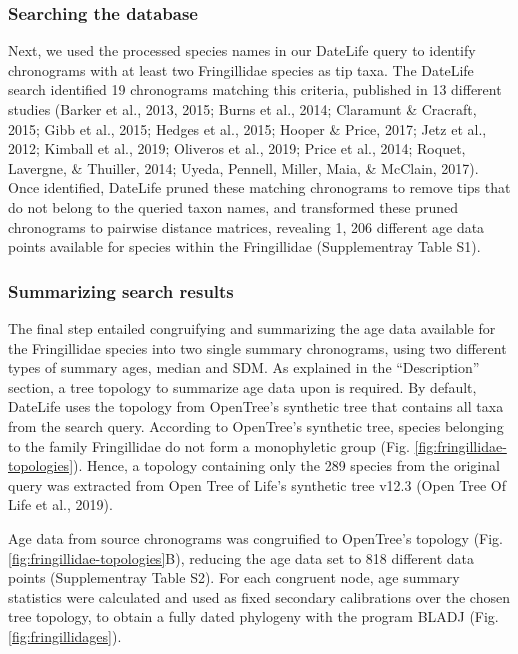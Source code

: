 \documentclass[english,man]{apa6}
\begin{document}
\hypertarget{searching-the-database-1}{%
\subsubsection{Searching the database}\label{searching-the-database-1}}

Next, we used the processed species names in our DateLife query to identify chronograms with at least two Fringillidae species as tip taxa.
The DateLife search identified 19 chronograms matching this criteria, published in 13 different studies (Barker et al., 2013, 2015; Burns et al., 2014; Claramunt \& Cracraft, 2015; Gibb et al., 2015; Hedges et al., 2015; Hooper \& Price, 2017; Jetz et al., 2012; Kimball et al., 2019; Oliveros et al., 2019; Price et al., 2014; Roquet, Lavergne, \& Thuiller, 2014; Uyeda, Pennell, Miller, Maia, \& McClain, 2017).
Once identified, DateLife pruned these matching chronograms to remove tips that do not belong to the queried taxon names, and transformed these pruned chronograms to pairwise distance matrices, revealing 1, 206 different age data points available for species within the Fringillidae (Supplementray Table S1).

\hypertarget{summarizing-search-results-2}{%
\subsubsection{Summarizing search results}\label{summarizing-search-results-2}}

The final step entailed congruifying and summarizing the age data available for the Fringillidae species into two single summary chronograms, using two different types of summary ages, median and SDM.
As explained in the \enquote{Description} section, a tree topology to summarize age data upon is required.
By default, DateLife uses the topology from OpenTree's synthetic tree that contains all taxa from the search query.
According to OpenTree's synthetic tree, species belonging to the family Fringillidae do not form a monophyletic group (Fig. \ref{fig:fringillidae-topologies}). Hence, a topology containing only the 289 species from the original query was extracted from Open Tree of Life's synthetic tree v12.3 (Open Tree Of Life et al., 2019).

Age data from source chronograms was congruified to OpenTree's topology (Fig. \ref{fig:fringillidae-topologies}B), reducing the age data set to 818 different data points (Supplementray Table S2). For each congruent node, age summary statistics were calculated and used as fixed secondary calibrations over the chosen tree topology, to obtain a fully dated phylogeny with the program BLADJ (Fig. \ref{fig:fringillidages}).
\end{document}
